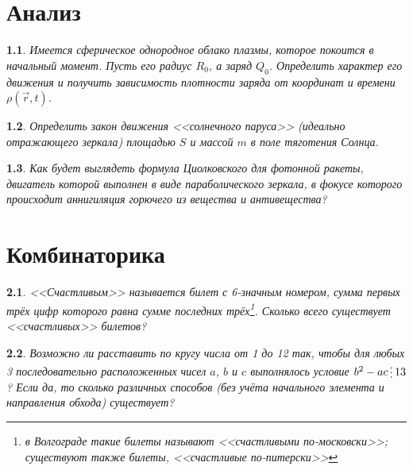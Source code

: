 \documentclass[a4paper]{book}
\theoremstyle{problemstyle}
\newtheorem{problem}{} %
\newcommand{\divisible}{\mathop{\raisebox{-2pt}{\vdots}}}
\begin{document}
    \chapter{Анализ}
    \begin{problem}
        Имеется сферическое однородное облако плазмы, которое покоится в
        начальный момент. Пусть его радиус \( R_0 \), а заряд \( Q_0 \).
        Определить характер его движения и получить зависимость плотности заряда
        от координат и времени \( \rho(\vec{r}, t) \).
    \end{problem}
    \begin{problem}
        Определить закон движения <<солнечного паруса>> (идеально отражающего
        зеркала) площадью \( S \) и массой \(m\) в поле тяготения Солнца.
    \end{problem}
    \begin{problem}
        Как будет выглядеть формула Циолковского для фотонной ракеты, двигатель
        которой выполнен в виде параболического зеркала, в фокусе которого
        происходит аннигиляция горючего из вещества и антивещества?
    \end{problem}
    \chapter{Комбинаторика}
    \begin{problem}
        <<Счастливым>> называется билет с 6-значным номером, сумма первых трёх
        цифр которого равна сумме последних трёх\footnote{в Волгограде такие
        билеты называют <<счастливыми по-московски>>; существуют также билеты,
        <<счастливые по-питерски>>}. Сколько всего существует
        <<счастливых>> билетов?
    \end{problem}
    \begin{problem}
        Возможно ли расставить по кругу числа от 1 до 12 так, чтобы для любых 3
        последовательно расположенных чисел \(a\), \(b\) и \(c\) выполнялось
        условие \( b^2 - ac \divisible 13 \)? Если да, то сколько различных
        способов (без учёта начального элемента и направления обхода) существует?
    \end{problem}
\end{document}

